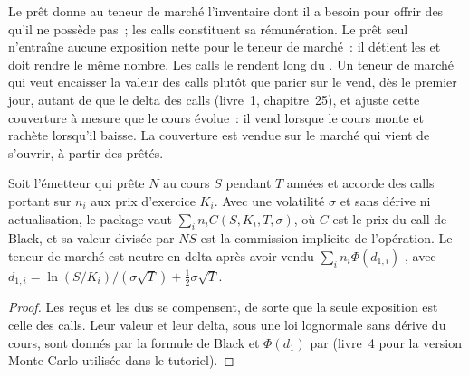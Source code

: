 Le prêt donne au teneur de marché l'inventaire dont il a besoin pour offrir des  qu'il ne possède pas~; les calls constituent sa rémunération. Le
prêt seul n'entraîne aucune exposition nette pour le teneur de marché~: il détient les  et doit rendre le même nombre. Les calls
le rendent long du . Un teneur de marché qui veut encaisser la valeur des calls plutôt que parier sur le  vend, dès le premier jour,
autant de  que le delta des calls (livre~1, chapitre~25), et ajuste cette couverture à mesure que le cours évolue~: il
vend lorsque le cours monte et rachète lorsqu'il baisse. La couverture est vendue sur le marché qui vient de s'ouvrir, à partir des
 prêtés.

\begin{proposition}\label{prop:m3:the-crypto-trading-business:deal}
Soit l'émetteur qui prête $N$  au cours $S$ pendant $T$ années et accorde des calls portant sur $n_i$  aux prix d'exercice $K_i$. Avec une volatilité
$\sigma$ et sans dérive ni actualisation, le package vaut $\sum_i n_i C(S, K_i, T, \sigma)$, où $C$ est le prix du call de Black,
et sa valeur divisée par $NS$ est la commission implicite de l'opération. Le teneur de marché est neutre en delta après avoir vendu
$\sum_i n_i \Phi(d_{1,i})$ , avec $d_{1,i} = \ln(S/K_i)/(\sigma\sqrt T) + \tfrac12\sigma\sqrt T$.
\end{proposition}

\begin{proof}
Les  reçus et les  dus se compensent, de sorte que la seule exposition est celle des calls. Leur valeur et leur delta, sous une loi lognormale sans dérive du cours,
sont donnés par la formule de Black et $\Phi(d_1)$ par  (livre~4 pour la version Monte Carlo utilisée dans le tutoriel).
\end{proof}

